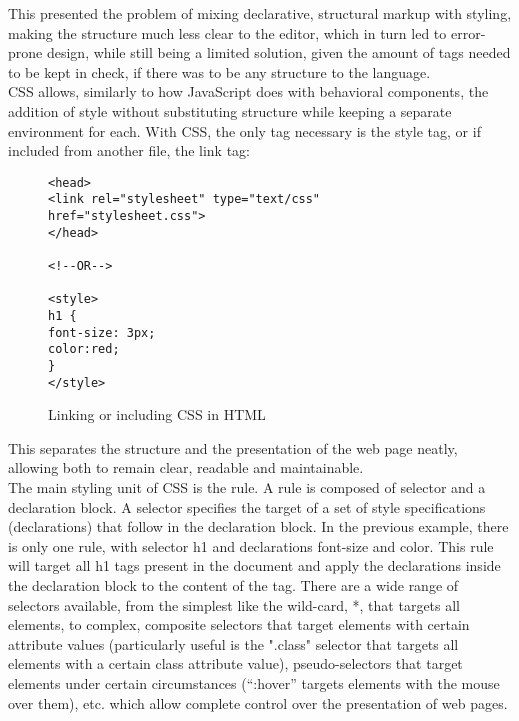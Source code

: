 This presented the problem of mixing declarative, structural markup with styling, making the structure much less clear to
the editor, which in turn led to error-prone design, while still being a limited solution, given the amount of tags needed
to be kept in check, if there was to be any structure to the language.\\

CSS allows, similarly to how JavaScript does with behavioral components, the addition of style without substituting
structure while keeping a separate environment for each. With CSS, the only tag necessary is the style tag, or if included
from another file, the link tag:
\begin{figure}[h]
\centering
{}
\begin{verbatim}
<head>
<link rel="stylesheet" type="text/css" href="stylesheet.css">
</head>

<!--OR-->

<style>
h1 {
font-size: 3px;
color:red;
}
</style>
\end{verbatim}
\caption{Linking or including CSS in HTML}
\end{figure}
This separates the structure and the presentation of the web page neatly, allowing both to remain clear, readable and
maintainable.\\

The main styling unit of CSS is the rule. A rule is composed of selector and a declaration block. A selector specifies the
target of a set of style specifications (declarations) that follow in the declaration block. In the previous example, there
is only one rule, with selector h1 and declarations font-size and color. This rule will target all h1 tags present in the
document and apply the declarations inside the declaration block to the content of the tag. There are a wide range of
selectors available, from the simplest like the wild-card, *, that targets all elements, to complex, composite selectors
that target elements with certain attribute values (particularly useful is the ".class" selector that targets all elements
with a certain class attribute value), pseudo-selectors that target elements under certain circumstances (``:hover''
targets elements with the mouse over them), etc. which allow complete control over the presentation of web pages.\\

